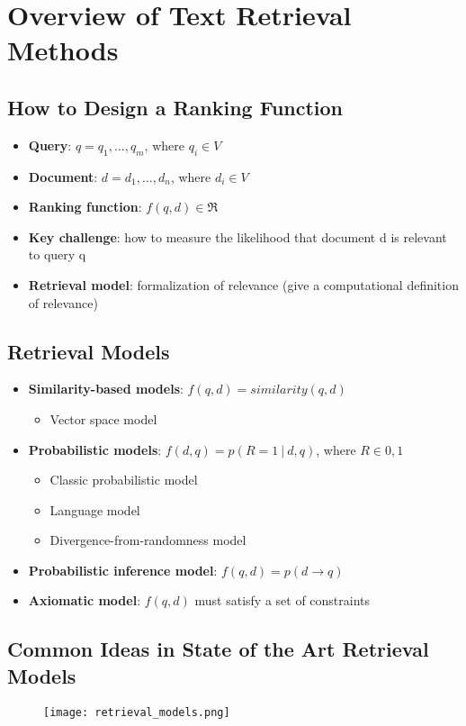 \section{Overview of Text Retrieval Methods}

\subsection{How to Design a Ranking Function}
\begin{itemize}
\item \textbf{Query}: $q = q_1,\dots ,q_m$, where $q_i \in V$
\item \textbf{Document}: $d = d_1,\dots ,d_n$, where $d_i \in V$
\item \textbf{Ranking function}: $f(q,d) \in \Re$
\item \textbf{Key challenge}: how to measure the likelihood that document d is relevant to query q
\item \textbf{Retrieval model}: formalization of relevance (give a computational definition of relevance)
\end{itemize}


\subsection{Retrieval Models}
\begin{itemize}
\item \textbf{Similarity-based models}: $f(q,d) = similarity(q,d)$
    \begin{itemize}
    \item Vector space model
    \end{itemize}
\item \textbf{Probabilistic models}: $f(d,q) = p(R=1 \:\big|\: d,q)$, where $R \in {0,1}$ 
    \begin{itemize}       
    \item Classic probabilistic model
    \item Language model
    \item Divergence-from-randomness model    
    \end{itemize}
\item \textbf{Probabilistic inference model}: $f(q,d) = p(d \rightarrow q)$
\item \textbf{Axiomatic model}: $f(q,d)$ must satisfy a set of constraints
\end{itemize}    


\subsection{Common Ideas in State of the Art Retrieval Models}
\begin{figure}[H]
    \centering
    \texttt{[image: retrieval\_models.png]}
\end{figure}

